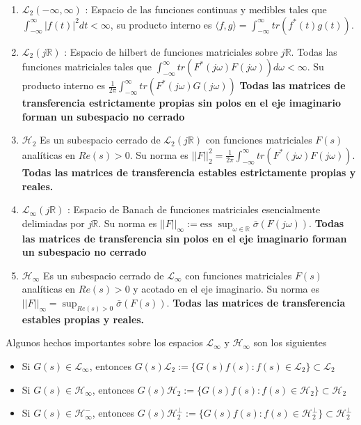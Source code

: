 \begin{enumerate}
    \item \textbf{$\mathcal{L}_2(-\infty,\infty)$ }: Espacio de las funciones continuas y medibles tales que $\int_{-\infty}^{\infty} |f(t)|^2 dt < \infty$, su producto interno es $\langle f,g \rangle = \int_{-\infty}^{\infty} tr(f^{*}(t)g(t))$.
    \item \textbf{$\mathcal{L}_2(j \mathbb{R})$ }:  Espacio de hilbert de funciones matriciales sobre $j \mathbb{R}$. Todas las funciones matriciales tales que $\int_{-\infty}^{\infty} tr(F^{*}(j \omega)F^{}(j \omega)) d \omega < \infty$. Su producto interno es $\frac{1}{2 \pi }\int_{-\infty}^{\infty}  tr( F^{*}(j \omega) G(j \omega) )$ \textbf{Todas las matrices de transferencia estrictamente propias sin polos en el eje imaginario forman un subespacio no cerrado}
    \item $\mathcal{H}_2$ Es un subespacio cerrado de $\mathcal{L}_2(j \mathbb{R})$ con funciones matriciales $F(s)$ analíticas en $Re(s) > 0$. Su norma es $ ||F||_2^2 =  \frac{1}{2 \pi }\int_{-\infty}^{\infty}  tr( F^{*}(j \omega) F (j \omega) )$. \textbf{Todas las matrices de transferencia estables estrictamente propias y reales.}
    \item \textbf{$\mathcal{L}_{\infty}(j \mathbb{R})$ }:  Espacio de Banach de funciones matriciales esencialmente delimiadas por $j \mathbb{R}$. Su norma es $||F||_{\infty} := \text{ess } \sup_{\omega \in \mathbb{R}}\bar{\sigma}(F(j \omega))  $. \textbf{Todas las matrices de transferencia sin polos en el eje imaginario forman un subespacio no cerrado}
     \item $\mathcal{H}_{\infty}$ Es un subespacio cerrado de $\mathcal{L}_{\infty}$ con funciones matriciales $F(s)$ analíticas en $Re(s) > 0$ y acotado en el eje imaginario. Su norma es $ ||F||_{\infty} =  \sup_{Re(s)>0} \bar{\sigma}(F(s))$. \textbf{Todas las matrices de transferencia estables propias y reales.}
\end{enumerate}

Algunos hechos importantes sobre los espacios $\mathcal{L}_{\infty}$ y $\mathcal{H}_{\infty}$ son los siguientes

\begin{itemize}
    \item Si $G(s) \in \mathcal{L}_{\infty}$, entonces $G(s)\mathcal{L}_2 := \{ G(s)f(s) : f(s) \in \mathcal{L}_2 \} \subset \mathcal{L}_2$
    \item Si $G(s) \in \mathcal{H}_{\infty}$, entonces $G(s)\mathcal{H}_2 := \{ G(s)f(s) : f(s) \in \mathcal{H}_2 \} \subset \mathcal{H}_2$
    \item Si $G(s) \in \mathcal{H}_{\infty}^-$, entonces $G(s)\mathcal{H}_2^{\perp} := \{ G(s)f(s) : f(s) \in \mathcal{H}_2^{\perp} \} \subset \mathcal{H}_2^{\perp}$
\end{itemize}

